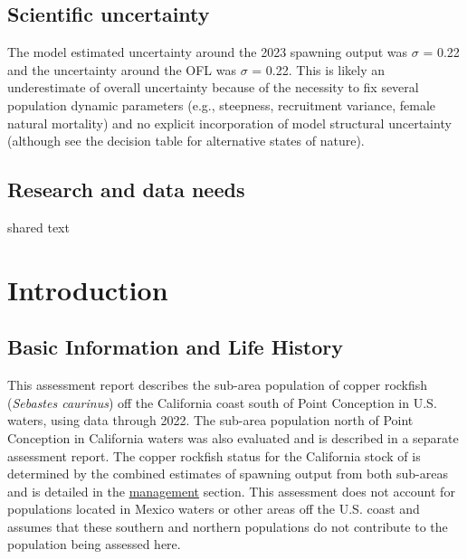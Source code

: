 \documentclass[11pt,
  english,
  letterpaper,
]{article}
\begin{document}
\endgroup{}

\hypertarget{scientific-uncertainty}{%
\subsection*{Scientific uncertainty}\label{scientific-uncertainty}}

The model estimated uncertainty around the 2023 spawning output was \(\sigma\) = 0.22 and the uncertainty around the OFL was \(\sigma\) = 0.22. This is likely an underestimate of overall uncertainty because of the necessity to fix several population dynamic parameters (e.g., steepness, recruitment variance, female natural mortality) and no explicit incorporation of model structural uncertainty (although see the decision table for alternative states of nature).

\hypertarget{research-and-data-needs}{%
\subsection*{Research and data needs}\label{research-and-data-needs}}

shared text

\pagebreak
\setlength{\parskip}{5mm plus1mm minus1mm}
\setcounter{page}{1}
\renewcommand{\thefigure}{\arabic{figure}}
\renewcommand{\thetable}{\arabic{table}}
\setcounter{table}{0}
\setcounter{figure}{0}

\hypertarget{introduction}{%
\section{Introduction}\label{introduction}}

\hypertarget{basic-information-and-life-history}{%
\subsection{Basic Information and Life History}\label{basic-information-and-life-history}}

This assessment report describes the sub-area population of copper rockfish (\emph{Sebastes caurinus}) off the California coast south of Point Conception in U.S. waters, using data through 2022. The sub-area population north of Point Conception in California waters was also evaluated and is described in a separate assessment report. The copper rockfish status for the California stock of is determined by the combined estimates of spawning output from both sub-areas and is detailed in the \protect\hyperlink{management}{management} section. This assessment does not account for populations located in Mexico waters or other areas off the U.S. coast and assumes that these southern and northern populations do not contribute to the population being assessed here.
\end{document}
